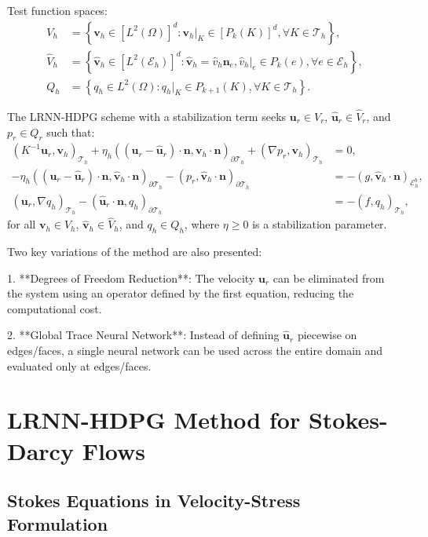 \documentclass[11pt,a4paper]{article}
\begin{document}
Test function spaces:
\begin{align}
V_h &= \left\{\mathbf{v}_h \in [L^2(\Omega)]^d : \mathbf{v}_h|_K \in [P_k(K)]^d, \forall K \in \mathcal{T}_h \right\}, \\
\hat{V}_h &= \left\{\hat{\mathbf{v}}_h \in [L^2(\mathcal{E}_h)]^d : \hat{\mathbf{v}}_h = \hat{v}_h\mathbf{n}_e, \hat{v}_h|_e \in P_k(e), \forall e \in \mathcal{E}_h \right\}, \\
Q_h &= \left\{q_h \in L^2(\Omega) : q_h|_K \in P_{k+1}(K), \forall K \in \mathcal{T}_h \right\}.
\end{align}

The LRNN-HDPG scheme with a stabilization term seeks $\mathbf{u}_r \in V_r$, $\hat{\mathbf{u}}_r \in \hat{V}_r$, and $p_r \in Q_r$ such that:
\begin{align}
(K^{-1}\mathbf{u}_r, \mathbf{v}_h)_{\mathcal{T}_h} + \eta_h((\mathbf{u}_r - \hat{\mathbf{u}}_r) \cdot \mathbf{n}, \mathbf{v}_h \cdot \mathbf{n})_{\partial\mathcal{T}_h} + (\nabla p_r, \mathbf{v}_h)_{\mathcal{T}_h} &= 0, \\
-\eta_h((\mathbf{u}_r - \hat{\mathbf{u}}_r) \cdot \mathbf{n}, \hat{\mathbf{v}}_h \cdot \mathbf{n})_{\partial\mathcal{T}_h} - (p_r, \hat{\mathbf{v}}_h \cdot \mathbf{n})_{\partial\mathcal{T}_h} &= -(g, \hat{\mathbf{v}}_h \cdot \mathbf{n})_{\mathcal{E}_h^b}, \\
(\mathbf{u}_r, \nabla q_h)_{\mathcal{T}_h} - (\hat{\mathbf{u}}_r \cdot \mathbf{n}, q_h)_{\partial\mathcal{T}_h} &= -(f, q_h)_{\mathcal{T}_h},
\end{align}
for all $\mathbf{v}_h \in V_h$, $\hat{\mathbf{v}}_h \in \hat{V}_h$, and $q_h \in Q_h$, where $\eta \geq 0$ is a stabilization parameter.

Two key variations of the method are also presented:

1. **Degrees of Freedom Reduction**: The velocity $\mathbf{u}_r$ can be eliminated from the system using an operator defined by the first equation, reducing the computational cost.

2. **Global Trace Neural Network**: Instead of defining $\hat{\mathbf{u}}_r$ piecewise on edges/faces, a single neural network can be used across the entire domain and evaluated only at edges/faces.

\section{LRNN-HDPG Method for Stokes-Darcy Flows}

\subsection{Stokes Equations in Velocity-Stress Formulation}
\end{document}
